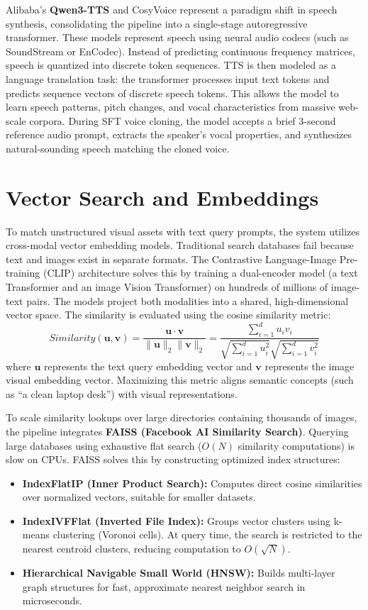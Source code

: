 \documentclass[a4paper,12pt]{report}
\begin{document}
Alibaba's \textbf{Qwen3-TTS} and CosyVoice represent a paradigm shift in speech synthesis, consolidating the pipeline into a single-stage autoregressive transformer. These models represent speech using neural audio codecs (such as SoundStream or EnCodec). Instead of predicting continuous frequency matrices, speech is quantized into discrete token sequences. TTS is then modeled as a language translation task: the transformer processes input text tokens and predicts sequence vectors of discrete speech tokens. This allows the model to learn speech patterns, pitch changes, and vocal characteristics from massive web-scale corpora. During SFT voice cloning, the model accepts a brief 3-second reference audio prompt, extracts the speaker's vocal properties, and synthesizes natural-sounding speech matching the cloned voice.

\section{Vector Search and Embeddings}
To match unstructured visual assets with text query prompts, the system utilizes cross-modal vector embedding models. Traditional search databases fail because text and images exist in separate formats. The Contrastive Language-Image Pre-training (CLIP) architecture solves this by training a dual-encoder model (a text Transformer and an image Vision Transformer) on hundreds of millions of image-text pairs. The models project both modalities into a shared, high-dimensional vector space. The similarity is evaluated using the cosine similarity metric:
\begin{equation}
    Similarity(\mathbf{u}, \mathbf{v}) = \frac{\mathbf{u} \cdot \mathbf{v}}{\|\mathbf{u}\|_2 \|\mathbf{v}\|_2} = \frac{\sum_{i=1}^d u_i v_i}{\sqrt{\sum_{i=1}^d u_i^2} \sqrt{\sum_{i=1}^d v_i^2}}
\end{equation}
where $\mathbf{u}$ represents the text query embedding vector and $\mathbf{v}$ represents the image visual embedding vector. Maximizing this metric aligns semantic concepts (such as ``a clean laptop desk'') with visual representations.

To scale similarity lookups over large directories containing thousands of images, the pipeline integrates \textbf{FAISS (Facebook AI Similarity Search)}. Querying large databases using exhaustive flat search ($O(N)$ similarity computations) is slow on CPUs. FAISS solves this by constructing optimized index structures:
\begin{itemize}
    \item \textbf{IndexFlatIP (Inner Product Search):} Computes direct cosine similarities over normalized vectors, suitable for smaller datasets.
    \item \textbf{IndexIVFFlat (Inverted File Index):} Groups vector clusters using k-means clustering (Voronoi cells). At query time, the search is restricted to the nearest centroid clusters, reducing computation to $O(\sqrt{N})$.
    \item \textbf{Hierarchical Navigable Small World (HNSW):} Builds multi-layer graph structures for fast, approximate nearest neighbor search in microseconds.
\end{itemize}
\end{document}
